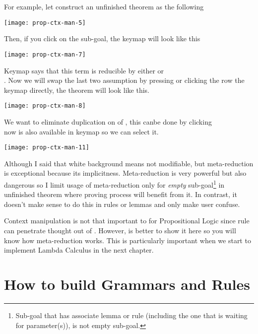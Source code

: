 \documentclass[master.tex]{subfiles}
\begin{document}
For example, let construct an unfinished theorem as the following

\begin{center}
  \texttt{[image: prop-ctx-man-5]}
\end{center}

Then, if you click  on the sub-goal, the keymap will look
like this

\begin{center}
  \texttt{[image: prop-ctx-man-7]}
\end{center}

Keymap says that this term is reducible by either  or \\
. Now we will swap the last two assumption by
pressing  or clicking the row the keymap directly, the theorem will look
like this.

\begin{center}
  \texttt{[image: prop-ctx-man-8]}
\end{center}

We want to eliminate duplication on of , this canbe
done by clicking  \\ now  is also
available in keymap so we can select it.

\begin{center}
  \texttt{[image: prop-ctx-man-11]}
\end{center}

Although I said that white background means not modifiable, but meta-reduction
is exceptional because its implicitness. Meta-reduction is very powerful but
also dangerous so I limit usage of meta-reduction only for \emph{empty}
sub-goal\footnote{Sub-goal that has associate lemma or rule (including the one
  that is waiting for parameter(s)), is not empty sub-goal.} in unfinished
theorem where proving process will benefit from it. In contrast, it doesn't make
sense to do this in rules or lemmas and only make user confuse.

Context manipulation is not that important to for Propositional Logic since rule
 can penetrate thought out of . However, is
better to show it here so you will know how meta-reduction works. This is
particularly important when we start to implement Lambda Calculus in the next
chapter.

\section{How to build Grammars and Rules}
\label{sec:how_to_built_grammars_and_rules}
\end{document}
